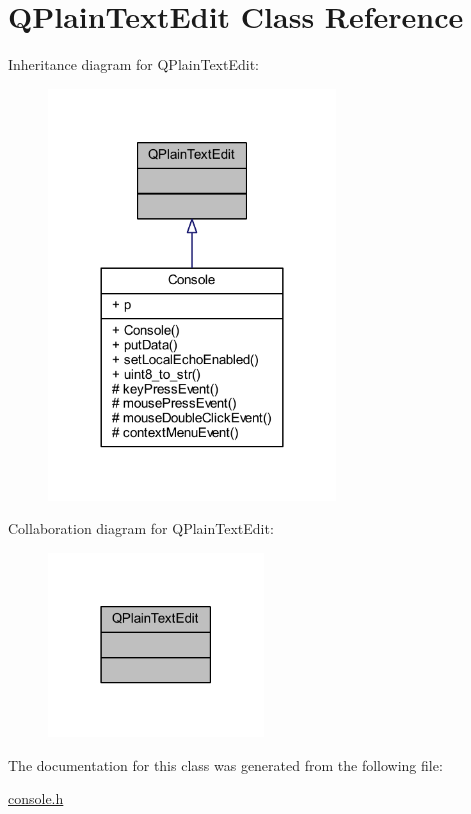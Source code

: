 \hypertarget{a00061}{\section{Q\+Plain\+Text\+Edit Class Reference}
\label{a00061}
}


Inheritance diagram for Q\+Plain\+Text\+Edit\+:
\nopagebreak
\begin{figure}[H]
\begin{center}
\leavevmode
\includegraphics[width=216pt]{d0/ddb/a00542}
\end{center}
\end{figure}


Collaboration diagram for Q\+Plain\+Text\+Edit\+:
\nopagebreak
\begin{figure}[H]
\begin{center}
\leavevmode
\includegraphics[width=162pt]{d4/d9c/a00543}
\end{center}
\end{figure}


The documentation for this class was generated from the following file\+:\begin{DoxyCompactItemize}
\item 
\hyperlink{a00088}{console.\+h}\end{DoxyCompactItemize}
